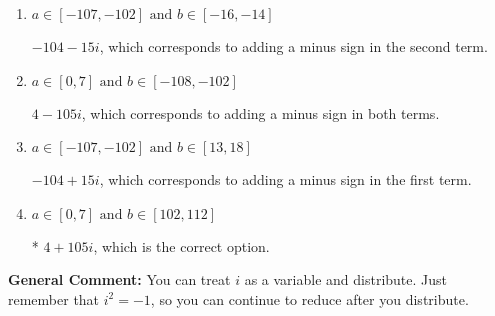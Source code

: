 \documentclass{extbook}[14pt]
\begin{document}
\begin{enumerate}
{\begin{enumerate}[label=\Alph*.]
 $-50 - 54 i$, which corresponds to just multiplying the real terms to get the real part of the solution and the coefficients in the complex terms to get the complex part.
\item \( a \in [-107, -102] \text{ and } b \in [-16, -14] \)

 $-104 - 15 i$, which corresponds to adding a minus sign in the second term.
\item \( a \in [0, 7] \text{ and } b \in [-108, -102] \)

 $4 - 105 i$, which corresponds to adding a minus sign in both terms.
\item \( a \in [-107, -102] \text{ and } b \in [13, 18] \)

 $-104 + 15 i$, which corresponds to adding a minus sign in the first term.
\item \( a \in [0, 7] \text{ and } b \in [102, 112] \)

* $4 + 105 i$, which is the correct option.
\end{enumerate}

\textbf{General Comment:} You can treat $i$ as a variable and distribute. Just remember that $i^2=-1$, so you can continue to reduce after you distribute.
}
\end{enumerate}
\end{document}
